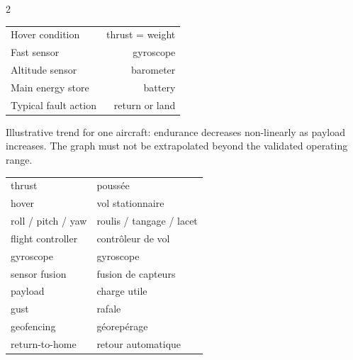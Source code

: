 \begin{multicols}{2}
\begin{keyfigures}
\begin{tabularx}{\linewidth}{@{}Xr@{}}
Hover condition & thrust = weight\\
Fast sensor & gyroscope\\
Altitude sensor & barometer\\
Main energy store & battery\\
Typical fault action & return or land
\end{tabularx}
\end{keyfigures}

\begin{tcolorbox}[title=\sffamily\bfseries Payload and endurance,colback=white,colframe=ECOrange]
\begin{center}
\end{center}
\footnotesize Illustrative trend for one aircraft: endurance decreases non-linearly as payload
increases. The graph must not be extrapolated beyond the validated operating range.
\end{tcolorbox}

\begin{vocabulary}
\begin{tabularx}{\linewidth}{@{}lX@{}}
thrust & poussée\\
hover & vol stationnaire\\
roll / pitch / yaw & roulis / tangage / lacet\\
flight controller & contrôleur de vol\\
gyroscope & gyroscope\\
sensor fusion & fusion de capteurs\\
payload & charge utile\\
gust & rafale\\
geofencing & géorepérage\\
return-to-home & retour automatique
\end{tabularx}
\end{vocabulary}


\end{multicols}
